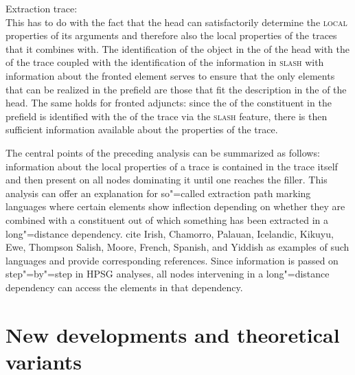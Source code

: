 \eas
\label{le-extraktionsspur}
Extraction trace: \\
\zs
This has to do with the fact that the head can satisfactorily determine the \textsc{local} properties of its arguments and therefore also the
local properties of the traces that it combines with. The identification of the object in the \subcatl of the head with the \synsemv of the trace 
coupled with the identification of the information in \textsc{slash} with information about the fronted element serves to ensure that the only elements
that can be realized in the prefield are those that fit the description in the \subcatl of the head. The same holds for fronted adjuncts: since the \localv of the constituent 
in the prefield is identified with the \localv of the trace via the \textsc{slash} feature, there is then sufficient information available about the properties
of the trace.

The central points of the preceding analysis can be summarized as follows: information about the local properties of a trace is contained in the trace
itself and then present on all nodes dominating it until one reaches the filler. This analysis can
offer an explanation for so"=called extraction path marking languages where 
certain elements show inflection depending on whether they are combined with a constituent out of which something has been extracted in a long"=distance dependency.
\citet*{BMS2001a} cite\label{page-Irish-complementizers}  Irish,
Chamorro, Palauan, Icelandic, Kikuyu,
Ewe, Thompson Salish, Moore, French, Spanish, and Yiddish as examples of such languages and provide corresponding references.
Since information is passed on step"=by"=step in HPSG analyses, all nodes intervening in a long"=distance dependency can access the elements
in that dependency.%

\section{New developments and theoretical variants}


